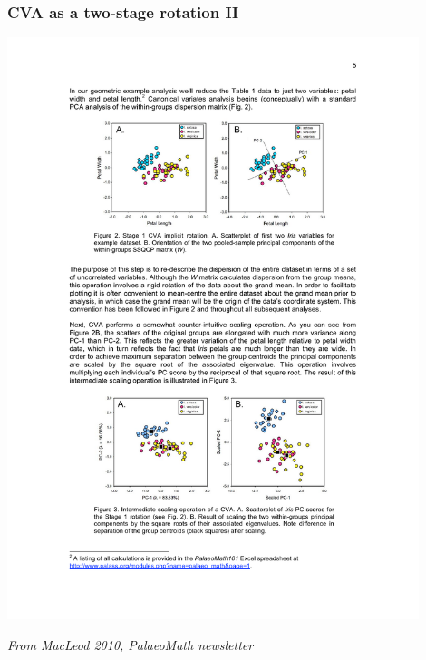 \documentclass{beamer}
\begin{document}
\begin{frame}
  \frametitle{CVA as a two-stage rotation II}
  
\begin{center}
\includegraphics[width=0.9\textwidth]{cva-as-rot2}
\end{center}

\hfill {\scriptsize \textit{From MacLeod 2010, PalaeoMath newsletter}}


\end{frame}
\end{document}
